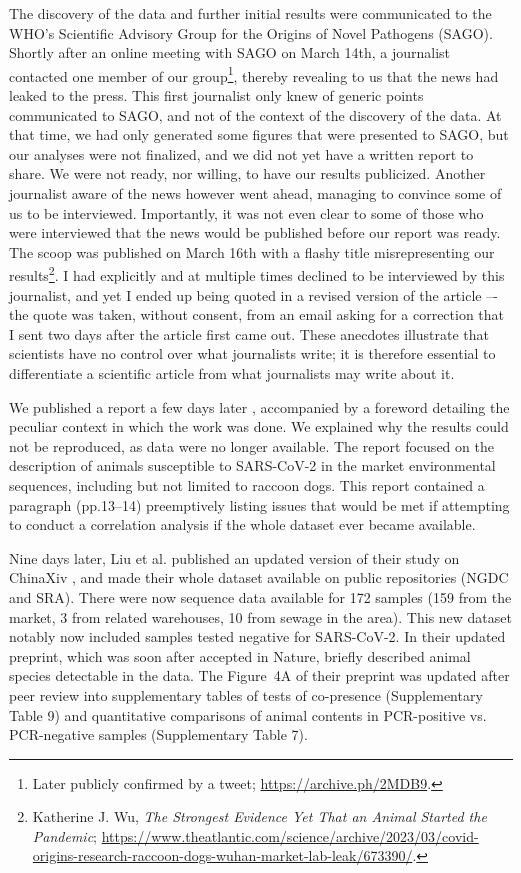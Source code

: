 \documentclass[11pt]{article}
\def \sct {\mbox{SARS-CoV-2}}
\begin{document}
The discovery of the data and further initial results were communicated to the WHO's Scientific Advisory Group for the Origins of Novel Pathogens (SAGO). Shortly after an online meeting with SAGO on March 14th, a journalist contacted one member of our group\footnote{Later publicly confirmed by a tweet; \url{https://archive.ph/2MDB9}.}, thereby revealing to us that the news had leaked to the press. This first journalist only knew of generic points communicated to SAGO, and not of the context of the discovery of the data. At that time, we had only generated some figures that were presented to SAGO, but our analyses were not finalized, and we did not yet have a written report to share. We were not ready, nor willing, to have our results publicized. Another journalist aware of the news however went ahead, managing to convince some of us to be interviewed. Importantly, it was not even clear to some of those who were interviewed that the news would be published before our report was ready. The scoop was published on March 16th with a flashy title misrepresenting our results\footnote{\label{foot:wu}Katherine J. Wu, \textit{The Strongest Evidence Yet That an Animal Started the Pandemic}; \url{https://www.theatlantic.com/science/archive/2023/03/covid-origins-research-raccoon-dogs-wuhan-market-lab-leak/673390/}.\par}. I had explicitly and at multiple times declined to be interviewed by this journalist, and yet I ended up being quoted in a revised version of the article –- the quote was taken, without consent, from an email asking for a correction that I sent two days after the article first came out. These anecdotes illustrate that scientists have no control over what journalists write; it is therefore essential to differentiate a scientific article from what journalists may write about it.

We published a report a few days later \citep{ACC2023Zenodo}, accompanied by a foreword detailing the peculiar context in which the work was done. We explained why the results could not be reproduced, as data were no longer available. The report focused on the description of animals susceptible to \sct{} in the market environmental sequences, including but not limited to raccoon dogs. This report contained a paragraph (pp.13--14) preemptively listing issues that would be met if attempting to conduct a correlation analysis if the whole dataset ever became available.
 
Nine days later, Liu et al. published an updated version of their study on ChinaXiv \citep{Liu2023ChinaXiv}, and made their whole dataset available on public repositories (NGDC and SRA). There were now sequence data available for 172 samples (159 from the market, 3 from related warehouses, 10 from sewage in the area). This new dataset notably now included samples tested negative for \sct{}. In their updated preprint, which was soon after accepted in Nature, \citet{Liu2023Nature} briefly described animal species detectable in the data. The Figure~4A of their preprint was updated after peer review into supplementary tables of tests of co-presence (Supplementary Table 9) and quantitative comparisons of animal contents in PCR-positive vs. PCR-negative samples (Supplementary Table 7). 
\end{document}

